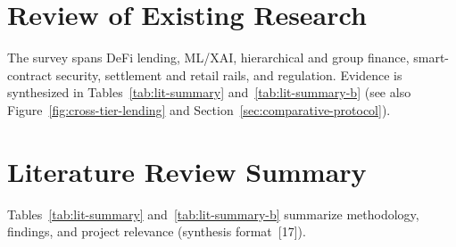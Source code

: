\documentclass[12pt, a4paper]{report}
\begin{document}
\section{Review of Existing Research}
\label{sec:review-existing}
\label{sec:lit-cross-tier}
\label{sec:lit-retail-payments}
\label{sec:lit-llm}

The survey spans DeFi lending, ML/XAI, hierarchical and group finance, smart-contract security, settlement and retail rails, and regulation. Evidence is synthesized in Tables~\ref{tab:lit-summary} and~\ref{tab:lit-summary-b} (see also Figure~\ref{fig:cross-tier-lending} and Section~\ref{sec:comparative-protocol}).

\section{Literature Review Summary}

Tables~\ref{tab:lit-summary} and~\ref{tab:lit-summary-b} summarize methodology, findings, and project relevance (synthesis format~[17]).
\end{document}
